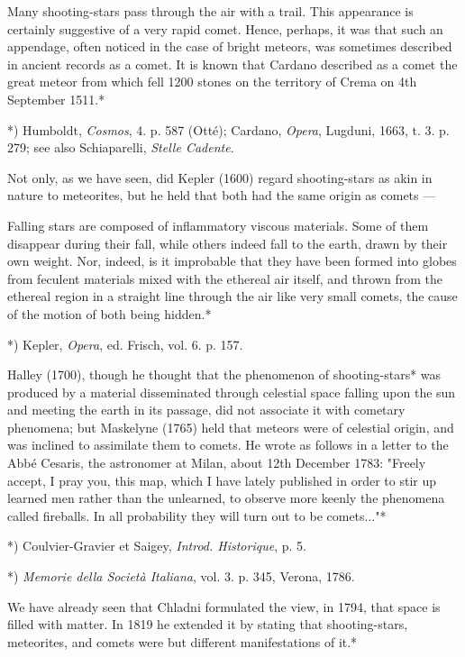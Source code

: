 \documentclass[a4paper, 12pt, oneside, polutonikogreek, english]{article}
\begin{document}
Many shooting-stars pass through the air with a trail. This appearance is certainly suggestive of a very rapid comet. Hence, perhaps, it was that such an appendage, often noticed in the case of bright meteors, was sometimes described in ancient records as a comet. It is known that Cardano described as a comet the great meteor from which fell 1200 stones on the territory of Crema on 4th September 1511.*

*) Humboldt, \emph{Cosmos}, 4. p. 587 (Otté); Cardano, \emph{Opera}, Lugduni, 1663, t. 3. p. 279; see also Schiaparelli, \emph{Stelle Cadente}.

Not only, as we have seen, did Kepler (1600) regard shooting-stars as akin in nature to meteorites, but he held that both had the same origin as comets ---

Falling stars are composed of inflammatory viscous materials. Some of them disappear during their fall, while others indeed fall to the earth, drawn by their own weight. Nor, indeed, is it improbable that they have been formed into globes from feculent materials mixed with the ethereal air itself, and thrown from the ethereal region in a straight line through the air like very small comets, the cause of the motion of both being hidden.*

*) Kepler, \emph{Opera}, ed. Frisch, vol. 6. p. 157.

Halley (1700), though he thought that the phenomenon of shooting-stars* was produced by a material disseminated through celestial space falling upon the sun and meeting the earth in its passage, did not associate it with cometary phenomena; but Maskelyne (1765) held that meteors were of celestial origin, and was inclined to assimilate them to comets. He wrote as follows in a letter to the Abbé Cesaris, the astronomer at Milan, about 12th December 1783: "Freely accept, I pray you, this map, which I have lately published in order to stir up learned men rather than the unlearned, to observe more keenly the phenomena called fireballs. In all probability they will turn out to be comets..."*

*) Coulvier-Gravier et Saigey, \emph{Introd. Historique}, p. 5.

*) \emph{Memorie della Società Italiana}, vol. 3. p. 345, Verona, 1786.

We have already seen that Chladni formulated the view, in 1794, that space is filled with matter. In 1819 he extended it by stating that shooting-stars, meteorites, and comets were but different manifestations of it.*
\end{document}
